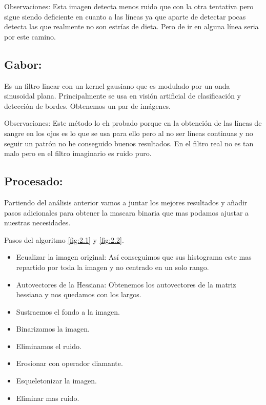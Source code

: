 Observaciones:
Esta imagen detecta menos ruido que con la otra tentativa pero sigue siendo deficiente en cuanto a las líneas ya que aparte de detectar pocas detecta las que realmente no son estrías de dieta. Pero de ir en alguna línea seria por este camino.



\subsection{Gabor:}

Es un filtro linear con un kernel gausiano  que es modulado por un onda sinusoidal plana. Principalmente se usa en visión artificial de clasificación y detección de bordes.
Obtenemos un par de imágenes.



Observaciones:
Este método lo eh probado porque en la obtención de las líneas de sangre en los ojos es lo que se usa para ello pero al no ser líneas continuas y no seguir un patrón no he conseguido buenos resultados. En el filtro real no es tan malo pero en el filtro imaginario es ruido puro.

\subsection{Procesado:}
Partiendo del análisis anterior vamos a juntar los mejores resultados y añadir pasos adicionales para obtener la mascara binaria que mas podamos ajustar a nuestras necesidades.


Pasos del algoritmo \ref{fig:2.1} y \ref{fig:2.2}.
\begin{itemize}
	\item Ecualizar la imagen original: Así conseguimos que sus histograma este mas repartido por toda la imagen y no centrado en un solo rango.
	\item Autovectores de la Hessiana: Obtenemos los autovectores de la matriz hessiana y nos quedamos con los largos. 
	\item Sustraemos el fondo a la imagen.
	\item Binarizamos la imagen.
	\item Eliminamos el ruido.
	\item Erosionar con operador diamante.
	\item Esqueletonizar la imagen.
	\item Eliminar mas ruido.
\end{itemize}



